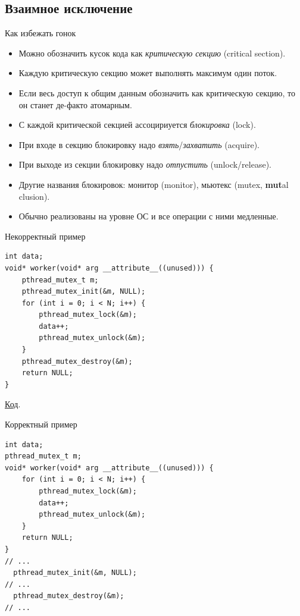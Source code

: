 \subsection{Взаимное исключение}

\begin{frame}
\end{frame}

\begin{frame}{Как избежать гонок}
	\begin{itemize}
		\item Можно обозначить кусок кода как \textit{критическую секцию} (critical section).
		\item Каждую критическую секцию может выполнять максимум один поток.
		\item
			Если весь доступ к общим данным обозначить как критическую секцию,
			то он станет де-факто атомарным.
		\item С каждой критической секцией ассоцириуется \textit{блокировка} (lock).
		\item При входе в секцию блокировку надо \textit{взять}/\textit{захватить} (acquire).
		\item При выходе из секции блокировку надо \textit{отпустить} (unlock/release).
		\item Другие названия блокировок: монитор (monitor), мьютекс (mutex, \textbf{mut}al clusion).
		\item Обычно реализованы на уровне ОС и все операции с ними медленные.
	\end{itemize}
\end{frame}

\begin{frame}[fragile]{Некорректный пример}
\begin{verbatim}
int data;
void* worker(void* arg __attribute__((unused))) {
    pthread_mutex_t m;
    pthread_mutex_init(&m, NULL);
    for (int i = 0; i < N; i++) {
        pthread_mutex_lock(&m);
        data++;
        pthread_mutex_unlock(&m);
    }
    pthread_mutex_destroy(&m);
    return NULL;
}
\end{verbatim}
\href{https://github.com/yeputons/fall-2016-paradigms/raw/master/161019/sources/09-two-threads-bad-mutex.c}{Код}.
\end{frame}

\begin{frame}[fragile]{Корректный пример}
\begin{verbatim}
int data;
pthread_mutex_t m;
void* worker(void* arg __attribute__((unused))) {
    for (int i = 0; i < N; i++) {
        pthread_mutex_lock(&m);
        data++;
        pthread_mutex_unlock(&m);
    }
    return NULL;
}
// ...
  pthread_mutex_init(&m, NULL);
// ...
  pthread_mutex_destroy(&m);
// ...
\end{verbatim}
\end{frame}

